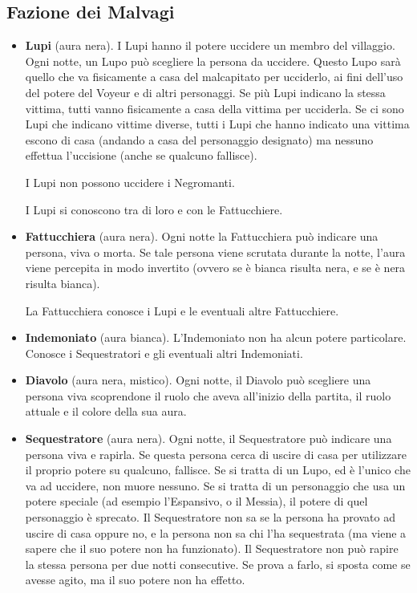 \documentclass[a4paper,10pt]{article}
\begin{document}
\subsection*{Fazione dei Malvagi}

\begin{itemize}
 \item {\bf Lupi} (aura nera). I Lupi hanno il potere uccidere un membro del villaggio.
 Ogni notte, un Lupo può scegliere la persona da uccidere. Questo Lupo sarà quello che va fisicamente a casa del malcapitato per ucciderlo, ai fini dell'uso del potere del Voyeur e di altri personaggi. Se più Lupi indicano la stessa vittima, tutti vanno fisicamente a casa della vittima per ucciderla.
 Se ci sono Lupi che indicano vittime diverse, tutti i Lupi che hanno indicato una vittima escono di casa (andando a casa del personaggio designato) ma nessuno effettua l'uccisione (anche se qualcuno fallisce).
 
 I Lupi non possono uccidere i Negromanti.
 
 I Lupi si conoscono tra di loro e con le Fattucchiere.

 \item {\bf Fattucchiera} (aura nera). Ogni notte la Fattucchiera può indicare una persona, viva o morta. Se tale persona viene scrutata durante la notte, l'aura viene percepita in modo invertito (ovvero se è bianca risulta nera, e se è nera risulta bianca).
 
 La Fattucchiera conosce i Lupi e le eventuali altre Fattucchiere.
 
 \item {\bf Indemoniato} (aura bianca). L'Indemoniato non ha alcun potere particolare. Conosce i Sequestratori e gli eventuali altri Indemoniati.

 \item {\bf Diavolo} (aura nera, mistico). Ogni notte, il Diavolo può scegliere una persona viva scoprendone il ruolo che aveva all'inizio della partita, il ruolo attuale e il colore della sua aura.
 
 \item {\bf Sequestratore} (aura nera). Ogni notte, il Sequestratore può indicare una persona viva e rapirla. Se questa persona cerca di uscire di casa per utilizzare il proprio potere su qualcuno, fallisce. Se si tratta di un Lupo, ed è l'unico che va ad uccidere, non muore nessuno. Se si tratta di un personaggio che usa un potere speciale (ad esempio l'Espansivo, o il Messia), il potere di quel personaggio è sprecato.
 Il Sequestratore non sa se la persona ha provato ad uscire di casa oppure no, e la persona non sa chi l'ha sequestrata (ma viene a sapere che il suo potere non ha funzionato).
 Il Sequestratore non può rapire la stessa persona per due notti consecutive. Se prova a farlo, si sposta come se avesse agito, ma il suo potere non ha effetto.
 

\end{itemize}
\end{document}
